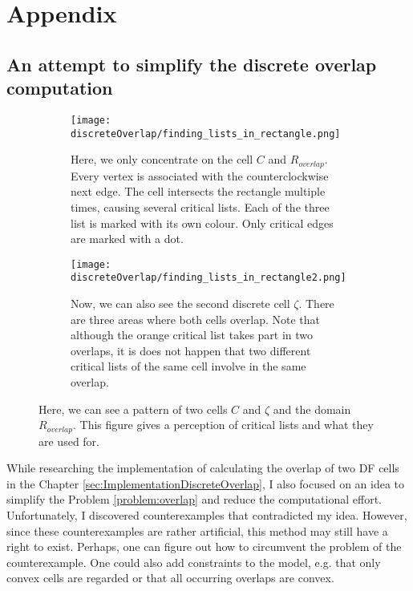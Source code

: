 \documentclass[a4paper,12pt,leqno]{article}
\theoremstyle{plain}
\theoremstyle{remark}
\begin{document}
\newpage
\section*{Appendix} \label{sec:appendix}
\subsection*{An attempt to simplify the discrete overlap computation}
\begin{figure}[b!]
	
	\centering
	\begin{subfigure}{0.4\textwidth}
		\texttt{[image: discreteOverlap/finding\_lists\_in\_rectangle.png]}
		\caption{Here, we only concentrate on the cell $C$ and $R_{overlap}$. Every vertex is associated with the counterclockwise next edge. The cell intersects the rectangle multiple times, causing several critical lists. Each of the three list is marked with its own colour. Only critical edges are marked with a dot. }
		\label{fig:criticalLists1}
	\end{subfigure}
	\hfill
	\begin{subfigure}{0.4\textwidth}
		\texttt{[image: discreteOverlap/finding\_lists\_in\_rectangle2.png]}
		\caption{Now, we can also see the second discrete cell $\zeta$. There are three areas where both cells overlap. Note that although the orange critical list takes part in two overlaps, it is does not happen that two different critical lists of the same cell involve in the same overlap.}
		\label{fig:fig:criticalLists2}
	\end{subfigure}
	
	
	\caption{Here, we can see a pattern of two cells $C$ and $\zeta$ and the domain $R_{overlap}$. This figure gives a perception of critical lists and what they are used for. }
	\label{fig:criticalLists}
	
\end{figure}
While researching the implementation of calculating the overlap of two DF cells in the Chapter \ref{sec:ImplementationDiscreteOverlap}, I also focused on an idea to simplify the Problem \ref{problem:overlap} and reduce the computational effort. \\
Unfortunately, I discovered counterexamples that contradicted my idea. However, since these counterexamples are rather artificial, this method may still have a right to exist. Perhaps, one can figure out how to circumvent the problem of the counterexample. One could also add constraints to the model, e.g. that only convex cells are regarded or that all occurring overlaps are convex. \\
\end{document}

